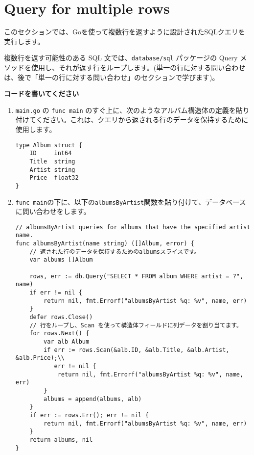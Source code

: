 \section{Query for multiple rows}

このセクションでは、Goを使って複数行を返すように設計されたSQLクエリを実行します。

複数行を返す可能性のある SQL 文では、\texttt{database/sql} パッケージの Query メソッドを使用し、それが返す行をループします。(単一の行に対する問い合わせは、後で「単一の行に対する問い合わせ」のセクションで学びます)。

\textbf{コードを書いてください}

\begin{enumerate}

\item \texttt{main.go} の \texttt{func main} のすぐ上に、次のようなアルバム構造体の定義を貼り付けてください。これは、クエリから返される行のデータを保持するために使用します。

\begin{lstlisting}[numbers=none]
type Album struct {
    ID     int64
    Title  string
    Artist string
    Price  float32
}
\end{lstlisting}

\item \texttt{func main}の下に、以下の\texttt{albumsByArtist}関数を貼り付けて、データベースに問い合わせをします。

\begin{lstlisting}[numbers=none]
// albumsByArtist queries for albums that have the specified artist name.
func albumsByArtist(name string) ([]Album, error) {
    // 返された行のデータを保持するためのalbumsスライスです。
    var albums []Album

    rows, err := db.Query("SELECT * FROM album WHERE artist = ?", name)
    if err != nil {
        return nil, fmt.Errorf("albumsByArtist %q: %v", name, err)
    }
    defer rows.Close()
    // 行をループし、Scan を使って構造体フィールドに列データを割り当てます。
    for rows.Next() {
        var alb Album
        if err := rows.Scan(&alb.ID, &alb.Title, &alb.Artist, &alb.Price);\\
           err != nil {
            return nil, fmt.Errorf("albumsByArtist %q: %v", name, err)
        }
        albums = append(albums, alb)
    }
    if err := rows.Err(); err != nil {
        return nil, fmt.Errorf("albumsByArtist %q: %v", name, err)
    }
    return albums, nil
}
\end{lstlisting}



\end{enumerate}
